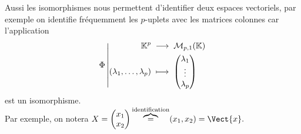 \documentclass{book}
\begin{document}
\begin{Texte}
\begin{center}
\begin{Figure}
\begin{tikzpicture}
\end{tikzpicture}
\end{Figure}
\end{center}
Aussi les isomorphismes nous permettent d'identifier deux espaces vectoriels, par exemple on identifie fréquemment les $p$-uplets avec les matrices colonnes 
car l'application
\[ \Fonction{\Phi }{\K ^p}{\M{p}{1}{\K}}{(\lambda_1,\dots,\lambda_p)}{\begin{pmatrix}\lambda_1\\\vdots\\\lambda_p\end{pmatrix}} \]
est un isomorphisme.\\
Par exemple, on notera $X=\begin{pmatrix}x_1\\x_2\\\end{pmatrix}\overbrace{=}^{\text{identification}}(x_1,x_2)=\Vect{x}.$
\end{Texte}
\end{document}
